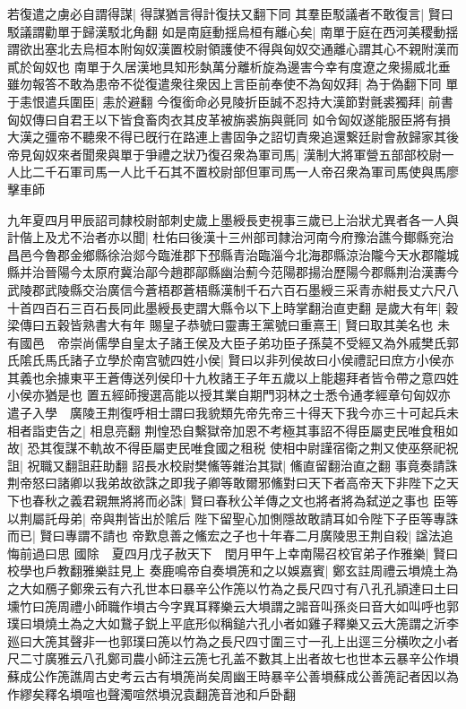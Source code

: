 若復遣之虜必自謂得謀|{
	得謀猶言得計復扶又翻下同}
其羣臣駁議者不敢復言|{
	賢曰駁議謂勸單于歸漢駁北角翻}
如是南庭動揺烏桓有離心矣|{
	南單于庭在西河美稷動揺謂欲出塞北去烏桓本附匈奴漢置校尉領護使不得與匈奴交通離心謂其心不親附漢而貳於匈奴也}
南單于久居漢地具知形埶萬分離析旋為邊害今幸有度遼之衆揚威北垂雖勿報答不敢為患帝不從復遣衆往衆因上言臣前奉使不為匈奴拜|{
	為于偽翻下同}
單于恚恨遣兵圍臣|{
	恚於避翻}
今復銜命必見陵折臣誠不忍持大漢節對氈裘獨拜|{
	前書匈奴傳曰自君王以下皆食畜肉衣其皮革被旃裘旃與氈同}
如令匈奴遂能服臣將有損大漢之彊帝不聽衆不得已旣行在路連上書固争之詔切責衆追還繋廷尉會赦歸家其後帝見匈奴來者聞衆與單于爭禮之狀乃復召衆為軍司馬|{
	漢制大將軍營五部部校尉一人比二千石軍司馬一人比千石其不置校尉部但軍司馬一人帝召衆為軍司馬使與馬廖擊車師}


九年夏四月甲辰詔司隸校尉部刺史歲上墨綬長吏視事三歲已上治狀尤異者各一人與計偕上及尤不治者亦以聞|{
	杜佑曰後漢十三州部司隸治河南今府豫治譙今鄼縣兖治昌邑今魯郡金鄉縣徐治郯今臨淮郡下邳縣青治臨淄今北海郡縣涼治隴今天水郡隴城縣并治晉陽今太原府冀治鄗今趙郡鄗縣幽治薊今范陽郡揚治歷陽今郡縣荆治漢夀今武陵郡武陵縣交治廣信今蒼梧郡蒼梧縣漢制千石六百石墨綬三采青赤紺長丈六尺八十首四百石三百石長同此墨綬長吏謂大縣令以下上時掌翻治直吏翻}
是歲大有年|{
	穀梁傳曰五穀皆熟書大有年}
賜皇子恭號曰靈夀王黨號曰重熹王|{
	賢曰取其美名也}
未有國邑　帝崇尚儒學自皇太子諸王侯及大臣子弟功臣子孫莫不受經又為外戚樊氏郭氏隂氏馬氏諸子立學於南宫號四姓小侯|{
	賢曰以非列侯故曰小侯禮記曰庶方小侯亦其義也余據東平王蒼傳送列侯印十九枚諸王子年五歲以上能趨拜者皆令帶之意四姓小侯亦猶是也}
置五經師搜選高能以授其業自期門羽林之士悉令通孝經章句匈奴亦遣子入學　廣陵王荆復呼相士謂曰我貌類先帝先帝三十得天下我今亦三十可起兵未相者詣吏告之|{
	相息亮翻}
荆惶恐自繫獄帝加恩不考極其事詔不得臣屬吏民唯食租如故|{
	恐其復謀不軌故不得臣屬吏民唯食國之租税}
使相中尉謹宿衛之荆又使巫祭祀祝詛|{
	祝職又翻詛莊助翻}
詔長水校尉樊鯈等雜治其獄|{
	鯈直留翻治直之翻}
事竟奏請誅荆帝怒曰諸卿以我弟故欲誅之即我子卿等敢爾邪鯈對曰天下者高帝天下非陛下之天下也春秋之義君親無將將而必誅|{
	賢曰春秋公羊傳之文也將者將為弑逆之事也}
臣等以荆屬託母弟|{
	帝與荆皆出於隂后}
陛下留聖心加惻隱故敢請耳如令陛下子臣等專誅而已|{
	賢曰專謂不請也}
帝歎息善之鯈宏之子也十年春二月廣陵思王荆自殺|{
	諡法追悔前過曰思}
國除　夏四月戊子赦天下　閏月甲午上幸南陽召校官弟子作雅樂|{
	賢曰校學也戶教翻雅樂註見上}
奏鹿鳴帝自奏塤箎和之以娛嘉賓|{
	鄭玄註周禮云塤燒土為之大如鴈子鄭衆云有六孔世本曰暴辛公作箎以竹為之長尺四寸有八孔孔頴達曰土曰壎竹曰箎周禮小師職作塤古今字異耳釋樂云大塤謂之嘂音叫孫炎曰音大如叫呼也郭璞曰塤燒土為之大如鵞子鋭上平底形似稱鎚六孔小者如雞子釋樂又云大箎謂之沂李廵曰大箎其聲非一也郭璞曰箎以竹為之長尺四寸圍三寸一孔上出逕三分横吹之小者尺二寸廣雅云八孔鄭司農小師注云箎七孔盖不數其上出者故七也世本云暴辛公作塤蘇成公作箎譙周古史考云古有塤箎尚矣周幽王時暴辛公善塤蘇成公善箎記者因以為作繆矣釋名塤喧也聲濁喧然塤況袁翻箎音池和戶卧翻}
